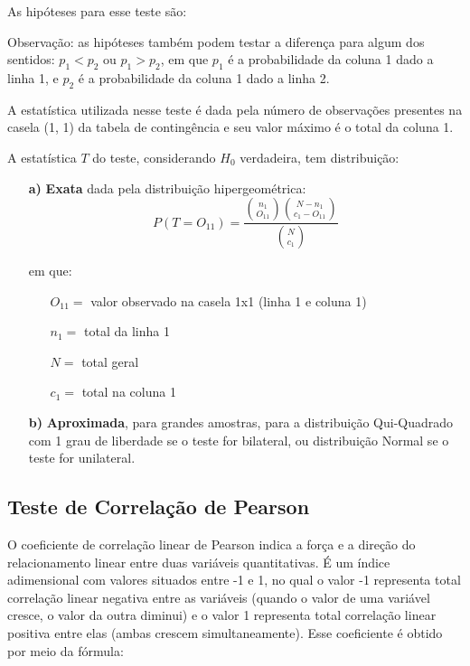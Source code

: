 \documentclass[
  portuguese,
]{estat/estat}
\begin{document}
As hipóteses para esse teste são:


Observação: as hipóteses também podem testar a diferença para algum dos
sentidos: \(p_{1} < p_{2}\) ou \(p_{1} > p_{2}\), em que \(p_{1}\) é a
probabilidade da coluna 1 dado a linha 1, e \(p_{2}\) é a probabilidade
da coluna 1 dado a linha 2.

A estatística utilizada nesse teste é dada pela número de observações
presentes na casela (1, 1) da tabela de contingência e seu valor máximo
é o total da coluna 1.

A estatística \(T\) do teste, considerando \(H_{0}\) verdadeira, tem
distribuição:

\begin{itemize}
    \item [\bf a)] \textbf{Exata} dada pela distribuição hipergeométrica:
    $$ P(T = O_{11}) = \frac{\binom{n_{1}}{O_{11}} \binom{N - n_{1}}{c_{1} - O_{11}}}{\binom{N}{c_{1}}} $$
    
    em que:
    \begin{itemize}
        \item [] $O_{11} =$ valor observado na casela 1x1 (linha 1 e coluna 1)
        \item [] $n_{1} =$ total da linha 1
        \item [] $N =$ total geral
        \item [] $c_{1} =$ total na coluna 1
    \end{itemize}
    
    \item [\bf b)] \textbf{Aproximada}, para grandes amostras, para a distribuição Qui-Quadrado com 1 grau de liberdade se o teste for bilateral, ou distribuição Normal se o teste for unilateral.
\end{itemize}

\subsection{Teste de Correlação de
Pearson}\label{teste-de-correlauxe7uxe3o-de-pearson}

O coeficiente de correlação linear de Pearson indica a força e a direção
do relacionamento linear entre duas variáveis quantitativas. É um índice
adimensional com valores situados entre -1 e 1, no qual o valor -1
representa total correlação linear negativa entre as variáveis (quando o
valor de uma variável cresce, o valor da outra diminui) e o valor 1
representa total correlação linear positiva entre elas (ambas crescem
simultaneamente). Esse coeficiente é obtido por meio da fórmula:
\end{document}
